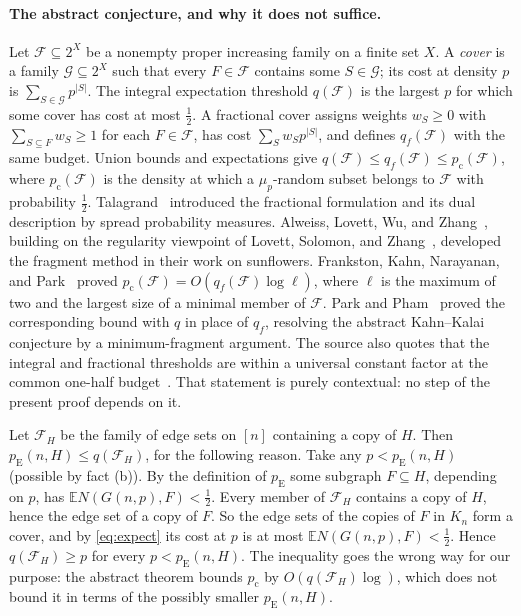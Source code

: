 \documentclass[11pt]{article}
\numberwithin{equation}{section}
\newcommand{\EE}{\mathbb E}
\newcommand{\pc}{p_{\mathrm c}}
\newcommand{\pE}{p_{\mathrm E}}
\begin{document}
\paragraph{The abstract conjecture, and why it does not suffice.}
Let $\mathcal F\subseteq2^X$ be a nonempty proper increasing family on
a finite set $X$. A \emph{cover} is a family $\mathcal G\subseteq2^X$
such that every $F\in\mathcal F$ contains some $S\in\mathcal G$; its
cost at density $p$ is $\sum_{S\in\mathcal G}p^{|S|}$. The integral
expectation threshold $q(\mathcal F)$ is the largest $p$ for which some
cover has cost at most $\frac12$. A fractional cover assigns weights
$w_S\ge0$ with $\sum_{S\subseteq F}w_S\ge1$ for each $F\in\mathcal F$,
has cost $\sum_Sw_Sp^{|S|}$, and defines $q_f(\mathcal F)$ with the
same budget. Union bounds and expectations give
$q(\mathcal F)\le q_f(\mathcal F)\le p_{\mathrm c}(\mathcal F)$, where
$p_{\mathrm c}(\mathcal F)$ is the density at which a $\mu_p$-random
subset belongs to $\mathcal F$ with probability $\frac12$.
Talagrand~\cite[Section~6]{Tal10} introduced the fractional formulation
and its dual description by spread probability measures. Alweiss,
Lovett, Wu, and Zhang~\cite{ALWZ21}, building on the regularity
viewpoint of Lovett, Solomon, and Zhang~\cite{LSZ19}, developed the
fragment method in their work on sunflowers. Frankston, Kahn,
Narayanan, and Park~\cite{FKNP21} proved
$p_{\mathrm c}(\mathcal F)=O(q_f(\mathcal F)\log\ell)$, where $\ell$ is
the maximum of two and the largest size of a minimal member of
$\mathcal F$. Park and Pham~\cite{PP24} proved the corresponding bound
with $q$ in place of $q_f$, resolving the abstract Kahn--Kalai
conjecture by a minimum-fragment argument. The source also quotes that
the integral and fractional thresholds are within a universal constant
factor at the common one-half
budget~\cite[Theorem~1.1]{OpenAIThresholdEquivalence2026}. That
statement is purely contextual: no step of the present proof depends
on it.

Let $\mathcal F_H$ be the family of edge sets on $[n]$ containing a copy
of $H$. Then $\pE(n,H)\le q(\mathcal F_H)$, for the following reason.
Take any $p<\pE(n,H)$ (possible by fact (b)). By the definition of
$\pE$ some subgraph $F\subseteq H$, depending on $p$, has
$\EE N(G(n,p),F)<\frac12$. Every member of $\mathcal F_H$ contains a copy
of $H$, hence the edge set of a copy of $F$. So the edge sets of the
copies of $F$ in $K_n$ form a cover, and by \eqref{eq:expect} its cost
at $p$ is at most $\EE N(G(n,p),F)<\frac12$. Hence
$q(\mathcal F_H)\ge p$ for every $p<\pE(n,H)$. The inequality goes the
wrong way for our purpose: the abstract theorem bounds $\pc$ by
$O(q(\mathcal F_H)\log)$, which does not bound it in terms of the
possibly smaller $\pE(n,H)$.
\end{document}

